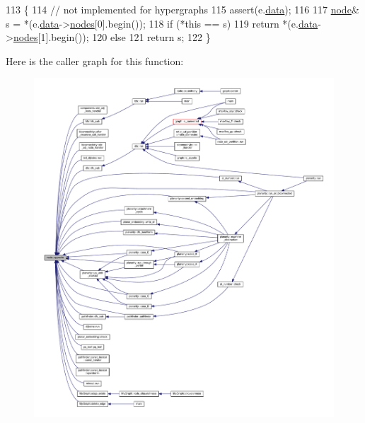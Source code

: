 \begin{DoxyCode}
113 \{
114     \textcolor{comment}{// not implemented for hypergraphs}
115     assert(e.\mbox{\hyperlink{classedge_a0ebb6dfa28b77f47529085049352b436}{data}});
116 
117     \mbox{\hyperlink{classnode}{node}}& s = *(e.\mbox{\hyperlink{classedge_a0ebb6dfa28b77f47529085049352b436}{data}}->\mbox{\hyperlink{classedge__data_a870bbbb05de6c5f63d434db624c55dd4}{nodes}}[0].begin());
118     \textcolor{keywordflow}{if} (*\textcolor{keyword}{this} == s)
119     \textcolor{keywordflow}{return} *(e.\mbox{\hyperlink{classedge_a0ebb6dfa28b77f47529085049352b436}{data}}->\mbox{\hyperlink{classedge__data_a870bbbb05de6c5f63d434db624c55dd4}{nodes}}[1].begin());
120     \textcolor{keywordflow}{else}
121     \textcolor{keywordflow}{return} s;
122 \}
\end{DoxyCode}
Here is the caller graph for this function\+:\nopagebreak
\begin{figure}[H]
\begin{center}
\leavevmode
\includegraphics[width=350pt]{classnode_a13dbd1809a33a5efede64a359e53a363_icgraph}
\end{center}
\end{figure}
\mbox{\label{classnode_a63b5d884763b0ed9a8c2c595d9cf060d}} 
